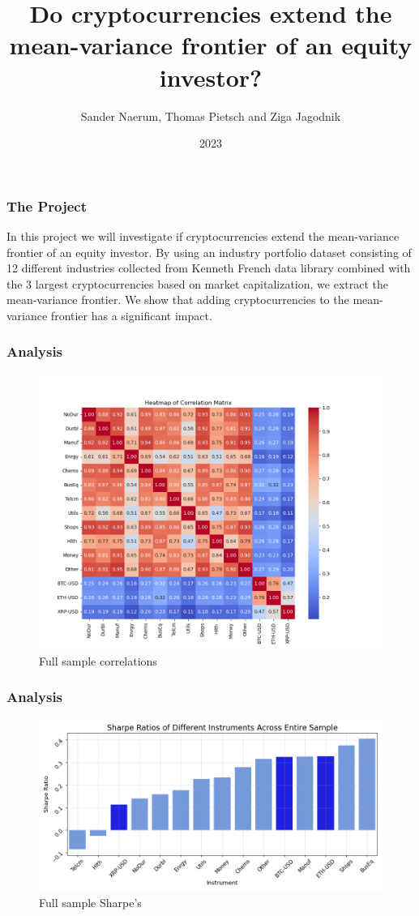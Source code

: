 \documentclass{beamer}
\title{Do cryptocurrencies extend the mean-variance frontier of an equity investor?}
\author{Sander Naerum, Thomas Pietsch and Ziga Jagodnik}
\institute{UZH}
\date{2023}
\begin{document}
\frame{\titlepage}

\begin{frame}
\frametitle{The Project}
In this project we will investigate if cryptocurrencies extend the mean-variance frontier of an equity investor. By using an industry portfolio dataset consisting of 12 different industries collected from Kenneth French data library combined with the 3 largest cryptocurrencies based on market capitalization, we extract the mean-variance frontier. We show that adding cryptocurrencies to the mean-variance frontier has a significant impact.
\end{frame}

\begin{frame}
\frametitle{Analysis}
\begin{figure}
    \centering
    \includegraphics[width=0.8\linewidth]{Figures/heatmap_correlation.png}
    \caption{Full sample correlations}
    \label{fig:corr}
\end{figure}
\end{frame}

\begin{frame}
\frametitle{Analysis}
\begin{figure}
    \centering
    \includegraphics[width=0.8\linewidth]{Figures/SR_Entire_Sample.png}
    \caption{Full sample Sharpe's}
    \label{fig:sharpe}
\end{figure}
\end{frame}
\end{document}
